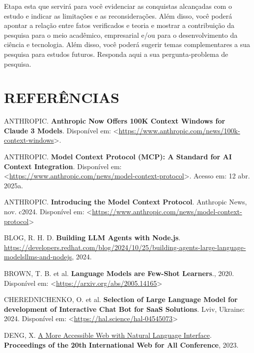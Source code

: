 \documentclass[
]{article}
\newlength{\cslhangindent}
\newenvironment{CSLReferences}[2] %
 {\begin{list}{}{%
  \setlength{\itemindent}{0pt}
  \setlength{\leftmargin}{0pt}
  \setlength{\parsep}{0pt}
  \ifodd #1
   \setlength{\leftmargin}{\cslhangindent}
   \setlength{\itemindent}{-1\cslhangindent}
  \fi
  \setlength{\itemsep}{#2\baselineskip}}}
 {\end{list}}
\begin{document}
Etapa esta que servirá para você evidenciar as conquistas alcançadas com
o estudo e indicar as limitações e as reconsiderações. Além disso, você
poderá apontar a relação entre fatos verificados e teoria e mostrar a
contribuição da pesquisa para o meio acadêmico, empresarial e/ou para o
desenvolvimento da ciência e tecnologia. Além disso, você poderá sugerir
temas complementares a sua pesquisa para estudos futuros. Responda aqui
a sua pergunta-problema de pesquisa.

\section*{REFERÊNCIAS}\label{referuxeancias}

\label{refs}
\begin{CSLReferences}{0}{1}
ANTHROPIC. \textbf{Anthropic Now Offers 100K Context Windows for Claude
3 Models}. Disponível em:
\textless{}\url{https://www.anthropic.com/news/100k-context-windows}\textgreater.

ANTHROPIC. \textbf{Model Context Protocol (MCP): A Standard for AI
Context Integration}. Disponível em:
\textless{}\url{https://www.anthropic.com/news/model-context-protocol}\textgreater.
Acesso em: 12 abr. 2025a.

ANTHROPIC. \textbf{{Introducing the Model Context Protocol}}. Anthropic
News, nov. c2024. Disponível em:
\textless{}\url{https://www.anthropic.com/news/model-context-protocol}\textgreater{}

BLOG, R. H. D. \textbf{Building LLM Agents with Node.js}.
\url{https://developers.redhat.com/blog/2024/10/25/building-agents-large-language-modelsllms-and-nodejs},
2024.

BROWN, T. B. et al. \textbf{Language Models are Few-Shot Learners}.,
2020. Disponível em:
\textless{}\url{https://arxiv.org/abs/2005.14165}\textgreater{}

CHEREDNICHENKO, O. et al. \textbf{Selection of Large Language Model for
development of Interactive Chat Bot for SaaS Solutions}. Lviv, Ukraine:
2024. Disponível em:
\textless{}\url{https://hal.science/hal-04545073}\textgreater{}

DENG, X. \href{https://api.semanticscholar.org/CorpusID:258259387}{A
More Accessible Web with Natural Language Interface}.
\textbf{Proceedings of the 20th International Web for All Conference},
2023.


\end{CSLReferences}
\end{document}
